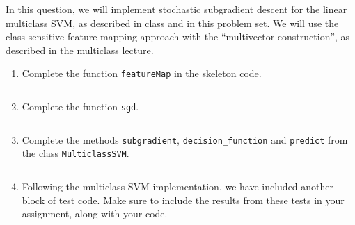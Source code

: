 \documentclass{article}
\theoremstyle{plain}
\theoremstyle{definition}
\begin{document}
In this question, we will implement stochastic subgradient descent
for the linear multiclass SVM, as described in class and in this
problem set. We will use the class-sensitive feature mapping approach
with the ``multivector construction'', as described in the multiclass lecture.
\begin{enumerate}
  \setcounter{enumi}{\value{saveenum}}
\item Complete the function \texttt{featureMap} in the skeleton code.
\begin{itemize}
    \color{blue}
             \inputminted[firstline=173, lastline=185, breaklines=True]{python}{hw_5.py}
\end{itemize}

\item Complete the function \texttt{sgd}.
\begin{itemize}
    \color{blue}
               \inputminted[firstline=186, lastline=209, breaklines=True]{python}{hw_5.py}
\end{itemize}

\item Complete the methods \texttt{subgradient}, \texttt{decision\_function} and \texttt{predict} from the class \texttt{MulticlassSVM}. 
\begin{itemize}
    \color{blue}
               \inputminted[firstline=211, lastline=291, breaklines=True]{python}{hw_5.py}
\end{itemize}

\item Following the multiclass
SVM implementation, we have included another block of test code. Make
sure to include the results from these tests in your assignment, along
with your code. 
\setcounter{saveenum}{\value{enumi}}
\end{enumerate}
\end{document}
